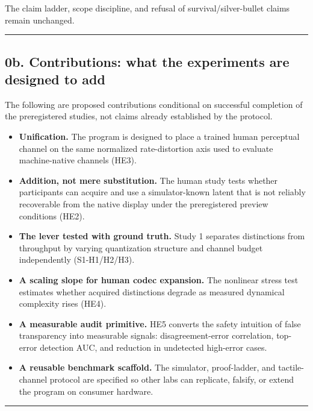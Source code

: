\documentclass[
  11pt,
]{article}
\providecommand{\tightlist}{%
  \setlength{\itemsep}{0pt}\setlength{\parskip}{0pt}}
\begin{document}
The claim ladder, scope discipline, and refusal of
survival/silver-bullet claims remain unchanged.

\begin{center}\rule{0.5\linewidth}{0.5pt}\end{center}

\subsection{0b. Contributions: what the experiments are
designed to
add}\label{b.-contributions-what-the-experiments-are-designed-to-add}

The following are proposed contributions conditional on
successful completion of the preregistered studies, not
claims already established by the protocol.

\begin{itemize}
\tightlist
\item
  \textbf{Unification.} The program is designed to
  place a trained human perceptual channel on the same
  normalized rate-distortion axis used to evaluate
  machine-native channels (HE3).
\item
  \textbf{Addition, not mere substitution.} The human
  study tests whether participants can acquire and use
  a simulator-known latent that is not reliably
  recoverable from the native display under the
  preregistered preview conditions (HE2).
\item
  \textbf{The lever tested with ground truth.} Study 1
  separates distinctions from throughput by varying
  quantization structure and channel budget
  independently (S1-H1/H2/H3).
\item
  \textbf{A scaling slope for human codec expansion.}
  The nonlinear stress test estimates whether acquired
  distinctions degrade as measured dynamical complexity
  rises (HE4).
\item
  \textbf{A measurable audit primitive.} HE5 converts
  the safety intuition of false transparency into
  measurable signals: disagreement-error correlation,
  top-error detection AUC, and reduction in undetected
  high-error cases.
\item
  \textbf{A reusable benchmark scaffold.} The
  simulator, proof-ladder, and tactile-channel protocol
  are specified so other labs can replicate, falsify,
  or extend the program on consumer hardware.
\end{itemize}

\begin{center}\rule{0.5\linewidth}{0.5pt}\end{center}
\end{document}
